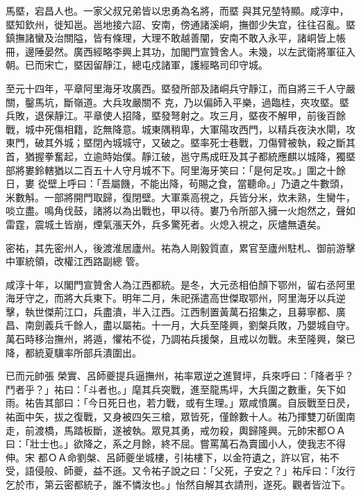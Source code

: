 \begin{pinyinscope}
 馬塈，宕昌人也。一家父叔兄弟皆以忠勇為名將，而塈
 與其兄堃特顯。咸淳中，塈知欽州，徙知邕。邕地接六詔、安南，傍通諸溪峒，撫御少失宜，往往召亂。塈鎮撫諸蠻及治關隘，皆有條理，大理不敢越善闡，安南不敢入永平，諸峒皆上帳冊，邊陲晏然。廣西經略李興上其功，加閣門宣贊舍人。未幾，以左武衛將軍征入朝。已而宋亡，塈因留靜江，總屯戍諸軍，護經略司印守城。



 至元十四年，平章阿里海牙攻廣西。塈發所部及諸峒兵守靜江，而自將三千人守嚴關，鑿馬坑，斷嶺道。大兵攻嚴關不
 克，乃以偏師入平樂，過臨桂，夾攻塈。塈兵敗，退保靜江。平章使人招降，塈發弩射之。攻三月，塈夜不解甲，前後百餘戰，城中死傷相籍，訖無降意。城東隅稍卑，大軍陽攻西門，以精兵夜決水閘，攻東門，破其外城；塈閉內城城守，又破之。塈率死士巷戰，刀傷臂被執，殺之斷其首，猶握拳奮起，立逾時始僕。靜江破，邕守馬成旺及其子都統應麒以城降，獨塈部將婁鈴轄猶以二百五十人守月城不下。阿里海牙笑曰：「是何足攻。」圍之十餘日，婁
 從壁上呼曰：「吾屬饑，不能出降，茍賜之食，當聽命。」乃遺之牛數頭，米數斛。一部將開門取歸，復閉壁。大軍乘高視之，兵皆分米，炊未熟，生臠牛，啖立盡。鳴角伐鼓，諸將以為出戰也，甲以待。婁乃令所部入擁一火炮然之，聲如雷霆，震城土皆崩，煙氣漲天外，兵多驚死者。火熄入視之，灰燼無遺矣。



 密祐，其先密州人，後渡淮居廬州。祐為人剛毅質直，累官至廬州駐札、御前游擊中軍統領，改權江西路副總
 管。



 咸淳十年，以閣門宣贊舍人為江西都統。是冬，大元丞相伯顏下鄂州，留右丞阿里海牙守之，而將大兵東下。明年二月，朱祀孫遣高世傑取鄂州，阿里海牙以兵逆擊，執世傑荊江口，兵盡潰，半入江西。江西制置黃萬石招集之，且募寧都、廣昌、南劍義兵千餘人，盡以屬祐。十一月，大兵至隆興，劉槃兵敗，乃嬰城自守。萬石時移治撫州，將遁，懼祐不從，乃調祐兵援槃，且戒以勿戰。未至隆興，槃已降，都統夏驥率所部兵潰圍出。



 已而元帥張
 榮實、呂師夔提兵逼撫州，祐率眾逆之進賢坪，兵來呼曰：「降者乎？鬥者乎？」祐曰：「斗者也。」麾其兵突戰，進至龍馬坪，大兵圍之數重，矢下如雨。祐告其部曰：「今日死日也，若力戰，或有生理。」眾咸憤厲。自辰戰至日昃，祐面中矢，拔之復戰，又身被四矢三槍，眾皆死，僅餘數十人。祐乃揮雙刀斫圍南走，前渡橋，馬踏板斷，遂被執。眾見其勇，戒勿殺，輿歸隆興。元帥宋都ＯＡ曰：「壯士也。」欲降之，系之月餘，終不屈。嘗罵萬石為賣國小人，使我志不得伸。宋
 都ＯＡ命劉槃、呂師夔坐城樓，引祐樓下，以金符遺之，許以官，祐不受，語侵般、師夔，益不遜。又令祐子說之曰：「父死，子安之？」祐斥曰：「汝行乞於市，第云密都統子，誰不憐汝也。」怡然自解其衣請刑，遂死。觀者皆泣下。




\end{pinyinscope}
